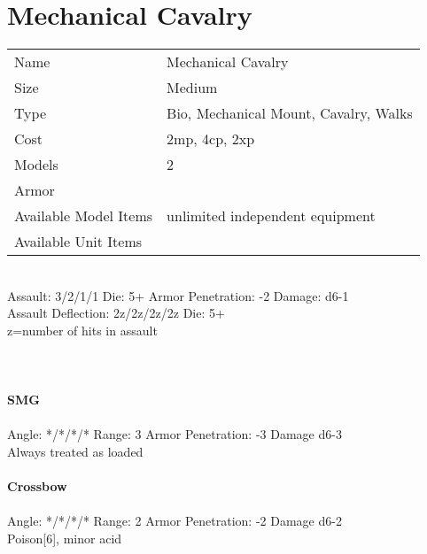 \pagebreak

\section{ Mechanical Cavalry }

\begin{tabular}{ll}
  Name & Mechanical Cavalry \\
  Size & Medium\\
  Type & Bio, Mechanical Mount, Cavalry, Walks\\
  Cost & 2mp, 4cp, 2xp\\
  Models & 2\\
  Armor & \\
  Available Model Items & unlimited independent equipment \\
  Available Unit Items &  \\
\end{tabular}

\ \\
Assault: 3/2/1/1 Die: 5+ Armor Penetration: -2 Damage: d6-1 \\
Assault Deflection: 2z/2z/2z/2z Die: 5+\\
\indent z=number of hits in assault \\
\ \\

\ \\
\ \\
{\bf SMG } \\
\ \\
Angle: */*/*/* Range: 3 Armor Penetration: -3 Damage d6-3 \\
\indent Always treated as loaded \\



\ \\
{\bf Crossbow } \\
\ \\
Angle: */*/*/* Range: 2 Armor Penetration: -2 Damage d6-2 \\
\indent Poison[6], minor acid \\






